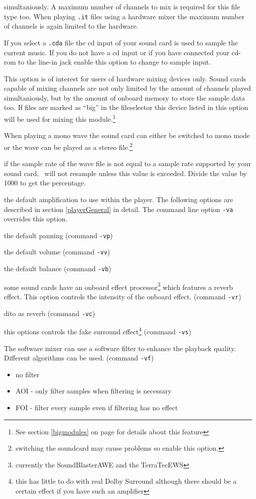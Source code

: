 \begin{dojlist}
simultaniously. A maximum number of channels to mix is required for
this file type too. When playing \texttt{.it} files using a hardware
mixer the maximum number of channels is again limited to the hardware.
\item[cdsamplelinein] If you select a \texttt{.cda} file the cd input of your
sound card is used to sample the current music. If you do not have a
cd input or if you have connected your cd-rom to the line-in jack
enable this option to change to sample input.
\item[bigmodules] This option is of interest for users of hardware mixing
devices only. Sound cards capable of mixing channels are not only
limited by the amount of channels played simultaniously, but by the
amount of onboard memory to store the sample data too. If files are
marked as ``big'' in the fileselector this device listed in this
option will be used for mixing this module.\footnote{See section
\ref{bigmodules} on page \pageref{bigmodules} for details about this
feature}
\item[wavetostereo] When playing a mono wave the sound card can either be
switched to mono mode or the wave can be played as a stereo
file.\footnote{switching the soundcard may cause problems so enable
this option.}
\item[waveratetolerance] if the sample rate of the wave file is not equal to
a sample rate supported by your sound card, \cp\ will not resample
unless this value is exceeded. Divide the value by 1000 to get the
percentage.
\item[amplify] the default amplification to use within the player. The 
following options are described in section \ref{playerGeneral} in
detail. The command line option \texttt{-va} overrides this option.
\item[panning] the default panning (command \texttt{-vp})
\item[volume] the default volume (command \texttt{-vv})
\item[balance] the default balance (command \texttt{-vb})
\item[reverb] some sound cards have an onboard effect processor\footnote{currently
the SoundBlasterAWE and the TerraTecEWS} which features a reverb
effect. This option controls the intensity of the onboard
effect. (command \texttt{-vr})
\item[chorus] dito as reverb (command \texttt{-vc})
\item[surround] this options controls the fake surround effect\footnote{this
has little to do with real Dolby Surround although there should be a
certain effect if you have such an amplifier} (command \texttt{-vs})
\item[filter] The software mixer can use a software filter to enhance the
playback quality. Different algorithms can be used. (command
\texttt{-vf}) \begin{itemize} \item[0] no filter \item[1] AOI - only
filter samples when filtering is necessary \item[2] FOI - filter every
sample even if filtering has no effect \end{itemize}
\end{dojlist}

